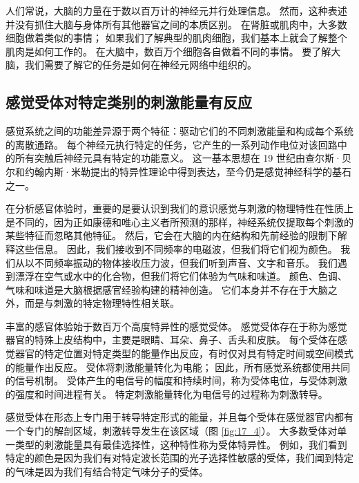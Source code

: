 人们常说，大脑的力量在于数以百万计的神经元并行处理信息。 
然而，这种表述并没有抓住大脑与身体所有其他器官之间的本质区别。 
在肾脏或肌肉中，大多数细胞做着类似的事情； 
如果我们了解典型的肌肉细胞，我们基本上就会了解整个肌肉是如何工作的。 
在大脑中，数百万个细胞各自做着不同的事情。 
要了解大脑，我们需要了解它的任务是如何在神经元网络中组织的。


\subsection{感觉受体对特定类别的刺激能量有反应}

感觉系统之间的功能差异源于两个特征：驱动它们的不同刺激能量和构成每个系统的离散通路。 
每个神经元执行特定的任务，它产生的一系列动作电位对该回路中的所有突触后神经元具有特定的功能意义。 
这一基本思想在 19 世纪由查尔斯·贝尔和约翰内斯·米勒提出的特异性理论中得到表达，至今仍是感觉神经科学的基石之一。


在分析感官体验时，重要的是要认识到我们的意识感觉与刺激的物理特性在性质上是不同的，因为正如康德和唯心主义者所预测的那样，神经系统仅提取每个刺激的某些特征而忽略其他特征。 
然后，它会在大脑的内在结构和先前经验的限制下解释这些信息。 
因此，我们接收到不同频率的电磁波，但我们将它们视为颜色。 
我们从以不同频率振动的物体接收压力波，但我们听到声音、文字和音乐。 
我们遇到漂浮在空气或水中的化合物，但我们将它们体验为气味和味道。 
颜色、色调、气味和味道是大脑根据感官经验构建的精神创造。 
它们本身并不存在于大脑之外，而是与刺激的特定物理特性相关联。


丰富的感官体验始于数百万个高度特异性的感觉受体。 
感觉受体存在于称为感觉器官的特殊上皮结构中，主要是眼睛、耳朵、鼻子、舌头和皮肤。 
每个受体在感觉器官的特定位置对特定类型的能量作出反应，有时仅对具有特定时间或空间模式的能量作出反应。 
受体将刺激能量转化为电能； 
因此，所有感觉系统都使用共同的信号机制。 
受体产生的电信号的幅度和持续时间，称为受体电位，与受体刺激的强度和时间进程有关。
特定刺激能量转化为电信号的过程称为刺激转导。


感觉受体在形态上专门用于转导特定形式的能量，并且每个受体在感觉器官内都有一个专门的解剖区域，刺激转导发生在该区域（图 \ref{fig:17_4}）。 
大多数受体对单一类型的刺激能量具有最佳选择性，这种特性称为受体特异性。
例如，我们看到特定的颜色是因为我们有对特定波长范围的光子选择性敏感的受体，我们闻到特定的气味是因为我们有结合特定气味分子的受体。


